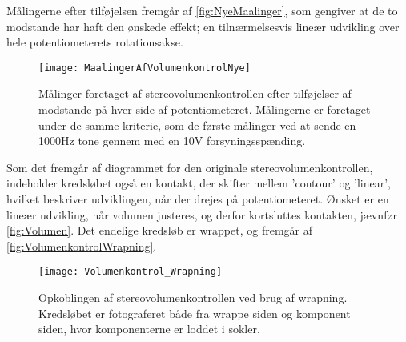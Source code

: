 Målingerne efter tilføjelsen fremgår af \autoref{fig:NyeMaalinger}, som gengiver at de to modstande har haft den ønskede effekt; en tilnærmelsesvis lineær udvikling over hele potentiometerets rotationsakse.
%
\begin{figure}[H]
	\centering
	\texttt{[image: MaalingerAfVolumenkontrolNye]}
	\caption{Målinger foretaget af stereovolumenkontrollen efter tilføjelser af modstande på hver side af potentiometeret. Målingerne er foretaget under de samme kriterie, som de første målinger ved at sende en 1000Hz tone gennem med en 10V forsyningsspænding.}
	\label{fig:NyeMaalinger}
\end{figure}
\noindent
%
Som det fremgår af diagrammet for den originale stereovolumenkontrollen, indeholder kredsløbet også en kontakt, der skifter mellem 'contour' og 'linear', hvilket beskriver udviklingen, når der drejes på potentiometeret. Ønsket er en lineær udvikling, når volumen justeres, og derfor kortsluttes kontakten, jævnfør \autoref{fig:Volumen}. Det endelige kredsløb er wrappet, og fremgår af \autoref{fig:VolumenkontrolWrapning}.
%
\begin{figure}[H]
	\centering
	\texttt{[image: Volumenkontrol\_Wrapning]}
	\caption{Opkoblingen af stereovolumenkontrollen ved brug af wrapning. Kredsløbet er fotograferet både fra wrappe siden og komponent siden, hvor komponenterne er loddet i sokler.}
	\label{fig:VolumenkontrolWrapning}
\end{figure}
\noindent